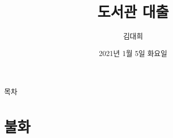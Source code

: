 \documentclass[aspectratio=1610,17pt,xcolor=pdftex,dvipsnames,table,handout]{beamer}
\begin{document}
	

			\title{ 도서관 대출 }
			\author{ 김대희 }
			\date{ 2021년 
					1월 						%
					5일 						%
					화요일   }					%


%
%
%
%

		\begin{frame}[plain]
		\titlepage
		\end{frame}


		\begin{frame} [plain]{목차}
		\tableofcontents
		\tableofcontents

		\end{frame}




		\begin{frame} [t,plain]
		\end{frame}			

		\begin{frame} [t,plain]
		\end{frame}			


		\part{ 불화 }
		\frame{\partpage}
\end{document}
